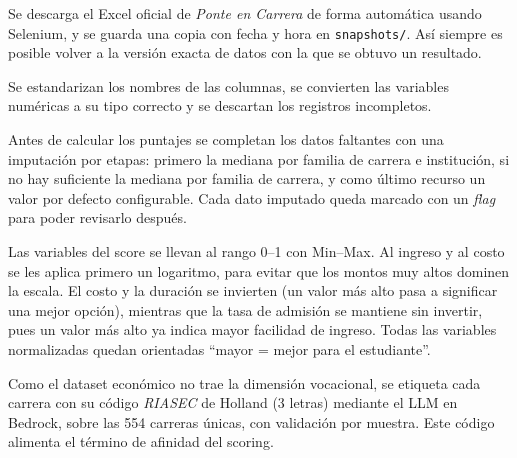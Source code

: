 \begin{description}[leftmargin=1.5em, style=nextline]
  \item[Recolecci\'on (\texttt{ingestion.py})] Se descarga el Excel oficial de
        \emph{Ponte en Carrera} de forma autom\'atica usando Selenium, y se guarda
        una copia con fecha y hora en \texttt{snapshots/}. As\'i siempre es posible
        volver a la versi\'on exacta de datos con la que se obtuvo un resultado.
  \item[Limpieza (\texttt{data\_clean.py})] Se estandarizan los nombres de las
        columnas, se convierten las variables num\'ericas a su tipo correcto y se
        descartan los registros incompletos.
  \item[Construcci\'on de variables (\texttt{feature\_engineering.py})] Antes de
        calcular los puntajes se completan los datos faltantes con una imputaci\'on
        por etapas: primero la mediana por familia de carrera e instituci\'on, si
        no hay suficiente la mediana por familia de carrera, y como \'ultimo
        recurso un valor por defecto configurable. Cada dato imputado queda marcado
        con un \emph{flag} para poder revisarlo despu\'es.
  \item[Normalizaci\'on] Las variables del score se llevan al rango 0--1 con
        Min--Max. Al ingreso y al costo se les aplica primero un logaritmo, para
        evitar que los montos muy altos dominen la escala. El costo y la
        duraci\'on se invierten (un valor m\'as alto pasa a significar una
        mejor opci\'on), mientras que la tasa de admisi\'on se mantiene sin
        invertir, pues un valor m\'as alto ya indica mayor facilidad de
        ingreso. Todas las variables normalizadas quedan orientadas ``mayor =
        mejor para el estudiante''.
  \item[Etiquetado vocacional (RIASEC)] Como el dataset econ\'omico no trae la
        dimensi\'on vocacional, se etiqueta cada carrera con su c\'odigo
        \emph{RIASEC} de Holland (3 letras) mediante el LLM en Bedrock, sobre las
        554 carreras \'unicas, con validaci\'on por muestra. Este c\'odigo alimenta
        el t\'ermino de afinidad del scoring.
\end{description}

